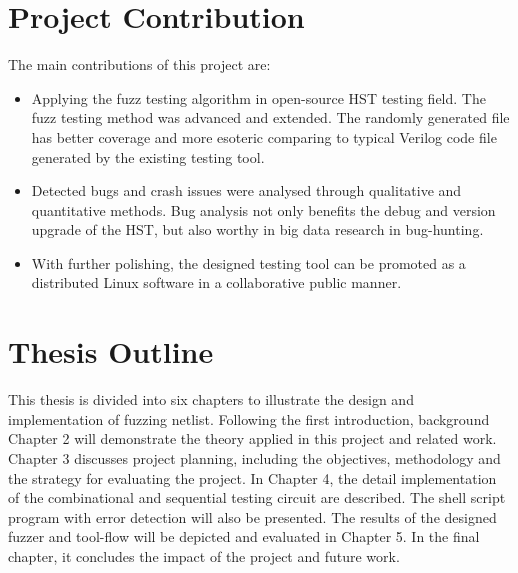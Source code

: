 \section{Project Contribution}
The main contributions of this project are:
\begin{itemize}
    \item Applying the fuzz testing algorithm in open-source HST testing field. The fuzz testing method was advanced and extended. The randomly generated file has better coverage and more esoteric comparing to typical Verilog code file generated by the existing testing tool.
    \item Detected bugs and crash issues were analysed through qualitative and quantitative methods. Bug analysis not only benefits the debug and version upgrade of the HST, but also worthy in big data research in bug-hunting. 
    \item With further polishing, the designed testing tool can be promoted as a distributed Linux software in a collaborative public manner.
\end{itemize}

\section{Thesis Outline}
This thesis is divided into six chapters to illustrate the design and implementation of fuzzing netlist. Following the first introduction, background Chapter 2 will demonstrate the theory applied in this project and related work. Chapter 3 discusses project planning, including the objectives, methodology and the strategy for evaluating the project. In Chapter 4, the detail implementation of the combinational and sequential testing circuit are described. The shell script program with error detection will also be presented. The results of the designed fuzzer and tool-flow will be depicted and evaluated in Chapter 5. In the final chapter, it concludes the impact of the project and future work. 
